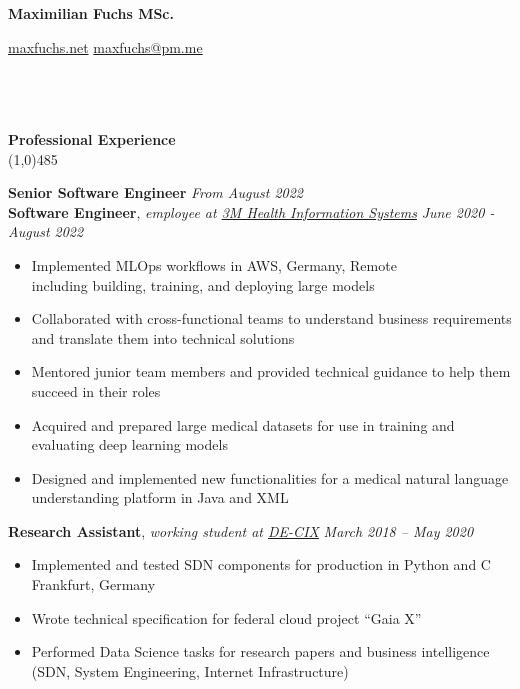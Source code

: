 \documentclass[9pt]{extarticle}
\newcommand\negativespace[1][-0.12cm]{\hspace*{#1}}
\begin{document}
\centerline{{\LARGE \bf Maximilian Fuchs MSc.}}
\centerline{\small \href{https://maxfuchs.net}{maxfuchs.net} \raisebox{0.25ex}{\tiny$\bullet$}  \href{mailto:maxfuchs@pm.me}{maxfuchs@pm.me}}


\noindent %
\\\\\\
\vspace*{-6pt}
{\negativespace \Large \bf Professional Experience}\\
\line(1,0){485}
\\
\noindent

\noindent
{\bf Senior Software Engineer}  \hfill \textit{From August 2022} \\
{\bf Software Engineer}, \textit{employee at \href{https://www.3m.com/3M/en_US/health-information-systems-us/support/international/}{3M Health Information Systems}}  \hfill \textit{June 2020 - August 2022} 
\begin{itemize}
\setlength\itemsep{0.05em}
\item Implemented MLOps workflows in AWS,   \hfill Germany, Remote \\
including building, training, and deploying large models
\item Collaborated with cross-functional teams to understand business requirements and translate them into technical solutions 
\item Mentored junior team members and provided technical guidance to help them succeed in their roles 
\item Acquired and prepared large medical datasets for use in training and evaluating deep learning models 
\item Designed and implemented new functionalities for a medical natural language understanding platform in Java and XML \\
\end{itemize}

\noindent
{\bf Research Assistant}, \textit{working student at \href{https://www.de-cix.net/}{DE-CIX}}   \hfill \textit{March 2018 -- May 2020}
\begin{itemize}
\setlength\itemsep{0.05em}
\item Implemented and tested SDN components for production in Python and C \hfill Frankfurt, Germany
\item Wrote technical specification for federal cloud project “Gaia X”
\item Performed Data Science tasks for research papers and business intelligence \\
(SDN, System Engineering, Internet Infrastructure) \\
\end{itemize}
\end{document}
